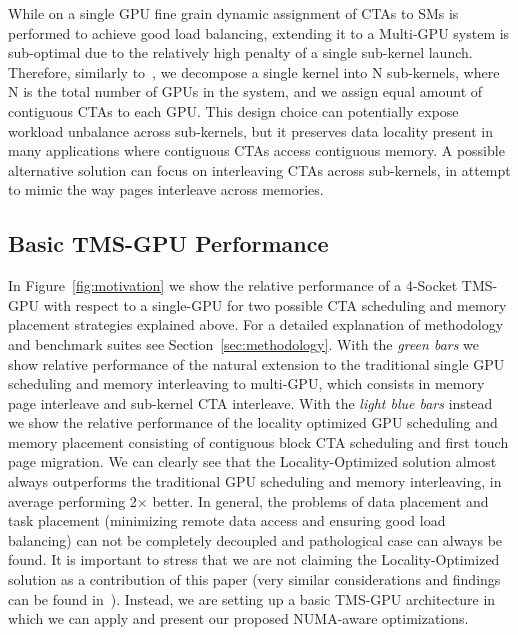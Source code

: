 While on a single GPU fine grain dynamic assignment of CTAs to SMs is performed
to achieve good load balancing, extending it to a Multi-GPU system is
sub-optimal due to the relatively high penalty of a single sub-kernel launch.
Therefore, similarly to~\cite{Cabezas2015}, we decompose a single kernel into N
sub-kernels, where N is the total number of GPUs in the system, and we assign
equal amount of contiguous CTAs to each GPU.  This design choice can potentially
expose workload unbalance across sub-kernels, but it preserves data locality
present in many applications where contiguous CTAs access contiguous memory. A
possible alternative solution can focus on interleaving CTAs across
sub-kernels, in attempt to mimic the way pages interleave across memories. 

\subsection{Basic TMS-GPU Performance} 
In Figure~\ref{fig:motivation} we show the relative performance of a 4-Socket 
TMS-GPU with respect to a single-GPU for two possible CTA scheduling and 
memory placement strategies explained above. For a detailed explanation of 
methodology and benchmark suites see Section~\ref{sec:methodology}. With the 
\emph{green bars} we show relative performance of the natural extension to 
the traditional single GPU scheduling and memory interleaving to multi-GPU, 
which consists in memory page interleave and sub-kernel CTA interleave. With 
the \emph{light blue bars} instead we show the relative performance of the 
locality optimized GPU scheduling and memory placement consisting of 
contiguous block CTA scheduling and first touch page migration. We can 
clearly see that the Locality-Optimized solution almost always outperforms 
the traditional GPU scheduling and memory interleaving, in average performing 
2$\times$ better. In general, the problems of data placement and task 
placement (minimizing remote data access and ensuring good load balancing) 
can not be completely decoupled and pathological case can always be found. It 
is important to stress that we are not claiming the Locality-Optimized 
solution as a contribution of this paper (very similar considerations and 
findings can be found in~\cite{Cabezas2015,Arunkumar2017}). Instead, we are 
setting up a basic TMS-GPU architecture in which we can apply and present our 
proposed NUMA-aware optimizations.

